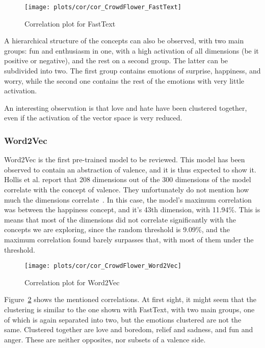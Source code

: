\begin{figure}[H]
  \texttt{[image: plots/cor/cor\_CrowdFlower\_FastText]}
  \centering
  \caption{Correlation plot for FastText}\label{fig:cor_CrowdFlower_FastText}
\end{figure}

A hierarchical structure of the concepts can also be observed, with two main groups: fun and enthusiasm in one, with a high activation of all dimensions (be it positive or negative), and the rest on a second group. The latter can be subdivided into two. The first group contains emotions of surprise, happiness, and worry, while the second one contains the rest of the emotions with very little activation.

An interesting observation is that love and hate have been clustered together, even if the activation of the vector space is very reduced.

\subsubsection{Word2Vec}
Word2Vec is the first pre-trained model to be reviewed. This model has been observed to contain an abstraction of valence, and it is thus expected to show it. Hollis et al. report that 208 dimensions out of the 300 dimensions of the model correlate with the concept of valence. They unfortunately do not mention how much the dimensions correlate~\cite{hollis2016principals}. In this case, the model's maximum correlation was between the happiness concept, and it's 43th dimension, with 11.94\%. This is means that most of the dimensions did not correlate significantly with the concepts we are exploring, since the random threshold is 9.09\%, and the maximum correlation found barely surpasses that, with most of them under the threshold.

\begin{figure}[H]
  \texttt{[image: plots/cor/cor\_CrowdFlower\_Word2Vec]}
  \centering
  \caption{Correlation plot for Word2Vec}\label{fig:cor_CrowdFlower_Word2Vec}
\end{figure}

Figure~\ref{fig:cor_CrowdFlower_Word2Vec} shows the mentioned correlations. At first sight, it might seem that the clustering is similar to the one shown with FastText, with two main groups, one of which is again separated into two, but the emotions clustered are not the same. Clustered together are love and boredom, relief and sadness, and fun and anger. These are neither opposites, nor subsets of a valence side.

